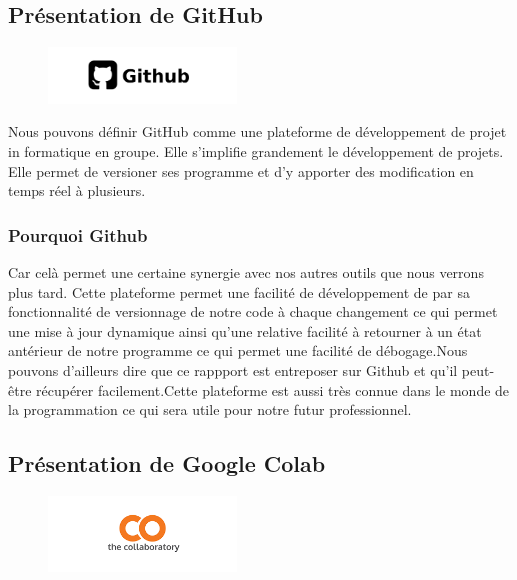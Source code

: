 \hypertarget{Pruxe9sentation-de-GitHub}{%
\subsection{Présentation de GitHub}
\label{Pruxe9sentation-de-GitHub}}

\begin{figure}[h]
  \begin{center}
  \includegraphics[width=5cm]{./images/github.jpg}
  \end{center}
\end{figure}

Nous pouvons définir GitHub comme une plateforme de développement de projet in formatique en groupe. Elle s'implifie grandement le développement de projets. Elle permet de versioner ses programme et d'y apporter des modification en temps réel à plusieurs.

\hypertarget{Pourquoi-Github}{%
\subsubsection{Pourquoi Github}
\label{Pourquoi-Github}}
Car celà permet une certaine synergie avec nos autres outils que nous verrons plus tard. Cette plateforme permet une facilité de développement de par sa fonctionnalité de versionnage de notre code à chaque changement ce qui permet une mise à jour dynamique ainsi qu'une relative facilité à retourner à un état antérieur de notre programme ce qui permet une facilité de débogage.Nous pouvons d'ailleurs dire que ce rappport est entreposer sur Github et qu'il peut-être récupérer facilement.Cette plateforme est aussi très connue dans le monde de la programmation ce qui sera utile pour notre futur professionnel.

\hypertarget{Pruxe9sentation-de-Google-Colab}{%
\subsection{Présentation de Google Colab}
\label{Pruxe9sentation-de-Google-Colab}}

\begin{figure}[h]
\begin{center}
\includegraphics[width=5cm]{./images/Colab_logo.png}
\end{center}
\end{figure}

